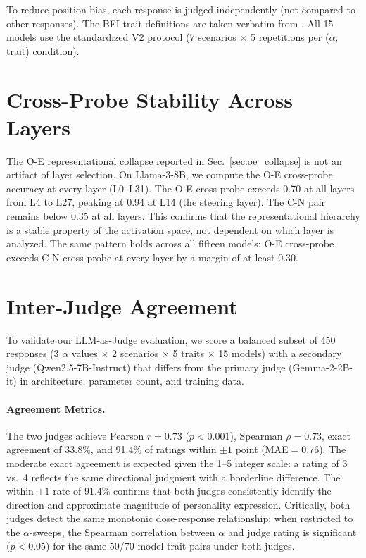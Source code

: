 \documentclass{article}
\begin{document}
To reduce position bias, each response is judged independently (not compared to other responses). The BFI trait definitions are taken verbatim from \citet{costa1992revised}. All 15 models use the standardized V2 protocol (7 scenarios $\times$ 5 repetitions per ($\alpha$, trait) condition).

\section{Cross-Probe Stability Across Layers}\label{app:crossprobe_layers}

The O-E representational collapse reported in Sec.~\ref{sec:oe_collapse} is not an artifact of layer selection. On Llama-3-8B, we compute the O-E cross-probe accuracy at every layer (L0--L31). The O-E cross-probe exceeds 0.70 at all layers from L4 to L27, peaking at 0.94 at L14 (the steering layer). The C-N pair remains below 0.35 at all layers. This confirms that the representational hierarchy is a stable property of the activation space, not dependent on which layer is analyzed. The same pattern holds across all fifteen models: O-E cross-probe exceeds C-N cross-probe at every layer by a margin of at least 0.30.

\section{Inter-Judge Agreement}\label{app:interjudge}

To validate our LLM-as-Judge evaluation, we score a balanced subset of 450 responses (3 $\alpha$ values $\times$ 2 scenarios $\times$ 5 traits $\times$ 15 models) with a secondary judge (Qwen2.5-7B-Instruct) that differs from the primary judge (Gemma-2-2B-it) in architecture, parameter count, and training data.

\paragraph{Agreement Metrics.} The two judges achieve Pearson $r{=}0.73$ ($p{<}0.001$), Spearman $\rho{=}0.73$, exact agreement of 33.8\%, and 91.4\% of ratings within $\pm1$ point (MAE${=}0.76$). The moderate exact agreement is expected given the 1--5 integer scale: a rating of 3 vs.\ 4 reflects the same directional judgment with a borderline difference. The within-$\pm1$ rate of 91.4\% confirms that both judges consistently identify the direction and approximate magnitude of personality expression. Critically, both judges detect the same monotonic dose-response relationship: when restricted to the $\alpha$-sweeps, the Spearman correlation between $\alpha$ and judge rating is significant ($p{<}0.05$) for the same 50/70 model-trait pairs under both judges.
\end{document}
